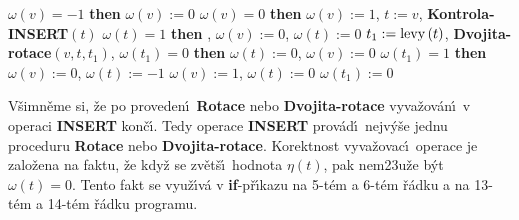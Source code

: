 \phantom{---}{\bf if} $\omega \left(v\right)=-1$ {\bf then}\newline 
\phantom{------}$\omega \left(v\right):=0$\newline 
\phantom{---}{\bf else}\newline 
\phantom{------}{\bf if} $\omega \left(v\right)=0$ {\bf then}\newline 
\phantom{---------}$\omega \left(v\right):=1$, $t:=v$, {\bf Kontrola-INSERT}$\left(t\right)$\newline 
\phantom{------}{\bf else}\newline 
\phantom{---------}{\bf if} $\omega \left(t\right)=1$ {\bf then}\newline 
\phantom{------------}{\bf Rotace$\left(v,t\right)$}, $\omega \left(v\right):=0$, $\omega \left(t\right):=0$\newline 
\phantom{---------}{\bf else}\newline 
\phantom{------------}$t_1:=\operatorname{levy}\left(t\right)$, {\bf Dvojita-rotace$\left(v,t,t_1\right)$},\newline 
\phantom{------------}{\bf if} $\omega \left(t_1\right)=0$ {\bf then}\newline 
\phantom{---------------}$\omega \left(t\right):=0$, $\omega \left(v\right):=0$\newline 
\phantom{------------}{\bf else}\newline 
\phantom{---------------}{\bf if} $\omega \left(t_1\right)=1$ {\bf then}\newline 
\phantom{------------------}$\omega \left(v\right):=0$, $\omega\left(t\right):=-1$\newline 
\phantom{---------------}{\bf else}\newline 
\phantom{------------------}$\omega \left(v\right):=1$, $\omega \left(t\right):=0$\newline 
\phantom{---------------}{\bf endif}\newline 
\phantom{------------}{\bf endif}\newline 
\phantom{------------}$\omega \left(t_1\right):=0$\newline 
\phantom{---------}{\bf endif}\newline 
\phantom{------}{\bf endif}\newline 
\phantom{---}{\bf endif\newline 
endif}
\bigskip

\flushpar V\v simn\v eme si, \v ze po proveden\'\i\ {\bf Rotace} nebo
{\bf Dvojita-rotace} vyva\v zov\'an\'\i\ v operaci {\bf INSERT} kon\v c\'\i . Tedy 
operace {\bf INSERT} prov\'ad\'\i\ nejv\'y\v se jednu proceduru {\bf Rotace }
nebo {\bf Dvojita-rota\-ce}. Korektnost vyva\v zovac\'\i\ operace je 
zalo\v zena na faktu, \v ze kdy\v z se zv\v et\v s\'\i\ hodnota $
\eta \left(t\right)$, pak 
nem\accent23u\v ze b\'yt $\omega \left(t\right)=0$. Tento fakt se vyu\v z\'\i v\'a  v 
{\bf if}-p\v r\'\i kazu na 5-t\'em a 6-t\'em \v r\'adku a na 13-t\'em a 14-t\'em  
\v r\'adku programu.
\medskip

